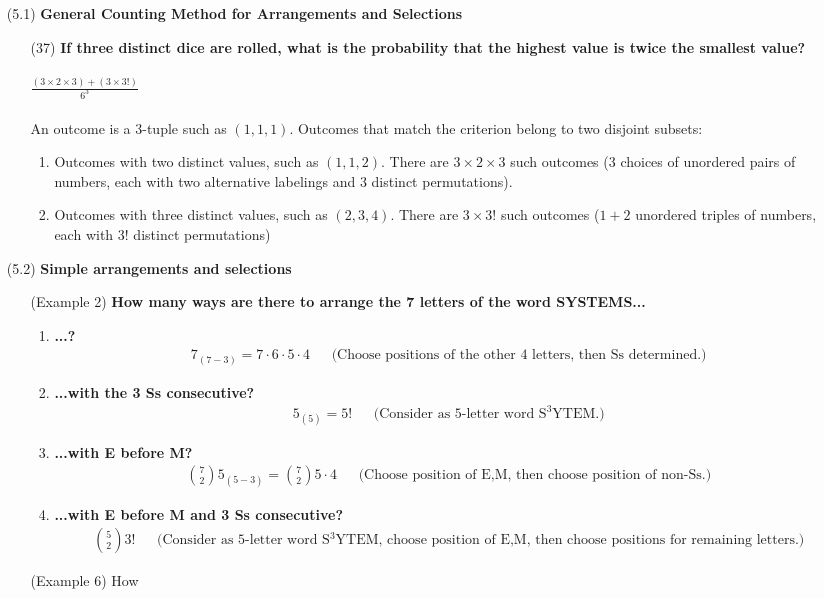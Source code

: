 \begin{enumerate}
\item[(5.1)] {\bf General Counting Method for Arrangements and Selections}
  \begin{enumerate}
  \item[(37)] {\bf If three distinct dice are rolled, what is the probability that the highest
      value is
      twice the smallest value?}\\~\\
    $\frac{(3 \times 2 \times 3) + (3 \times 3!)}{6^3}$\\~\\
    An outcome is a 3-tuple such as $(1,1,1)$. Outcomes that match the criterion belong to two
    disjoint subsets:
    \begin{enumerate}
    \item Outcomes with two distinct values, such as $(1,1,2)$. There are $3 \times 2 \times 3$
      such outcomes ($3$ choices of unordered pairs of numbers, each with two alternative labelings
      and $3$ distinct permutations).
    \item Outcomes with three distinct values, such as $(2,3,4)$. There are $3 \times 3!$ such
      outcomes ($1 + 2$ unordered triples of numbers, each with $3!$ distinct permutations)
    \end{enumerate}
  \end{enumerate}
  \newpage
\item[(5.2)] {\bf Simple arrangements and selections}
  \begin{enumerate}
  \item[(Example 2)] {\bf How many ways are there to arrange the 7 letters of the word SYSTEMS...}
    \begin{enumerate}
    \item {\bf ...?}\\
      \begin{align*}
        7_{(7 - 3)} = 7\cdot 6\cdot 5\cdot 4 ~~~~~~~\text{(Choose positions of the other 4 letters, then Ss determined.)}
      \end{align*}
    \item {\bf ...with the 3 Ss consecutive?}
      \begin{align*}
        5_{(5)} = 5! ~~~~~~~\text{(Consider as 5-letter word S$^3$YTEM.)}
      \end{align*}
    \item {\bf ...with E before M?}
      \begin{align*}
        {7 \choose 2}5_{(5 - 3)} = {7 \choose 2}5\cdot 4 ~~~~~~~\text{(Choose position of E,M, then choose position of non-Ss.)}
      \end{align*}
    \item {\bf ...with E before M and 3 Ss consecutive?}
      \begin{align*}
        {5 \choose 2} 3! ~~~~~~~\text{(Consider as 5-letter word S$^3$YTEM, choose position of E,M, then choose positions for remaining letters.)}
      \end{align*}
    \end{enumerate}
  \item[(Example 6)] How
  \end{enumerate}
\end{enumerate}
